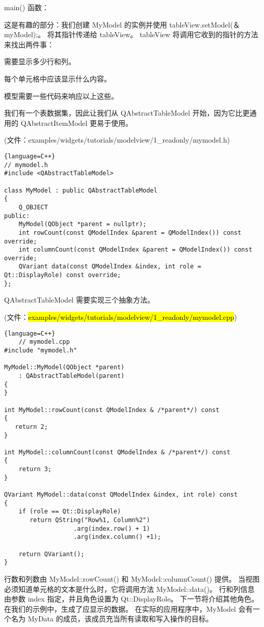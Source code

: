 main() 函数：

这是有趣的部分：我们创建 MyModel 的实例并使用 tableView.setModel(＆myModel);。 
将其指针传递给 tableView。 tableView 将调用它收到的指针的方法来找出两件事：

\begin{compactitem}
\item 需要显示多少行和列。
\item 每个单元格中应该显示什么内容。
\end{compactitem}

模型需要一些代码来响应以上这些。

我们有一个表数据集，因此让我们从 QAbstractTableModel 开始，因为它比更通用的 QAbstractItemModel 更易于使用。

(文件：examples/widgets/tutorials/modelview/1\_readonly/mymodel.h)

\begin{lstlisting}{language=C++}
// mymodel.h
#include <QAbstractTableModel>
	
class MyModel : public QAbstractTableModel
{
	Q_OBJECT
public:
	MyModel(QObject *parent = nullptr);
	int rowCount(const QModelIndex &parent = QModelIndex()) const override;
	int columnCount(const QModelIndex &parent = QModelIndex()) const override;
	QVariant data(const QModelIndex &index, int role = Qt::DisplayRole) const override;
};
\end{lstlisting}

QAbstractTableModel 需要实现三个抽象方法。

(文件：\hl{examples/widgets/tutorials/modelview/1\_readonly/mymodel.cpp})

\begin{lstlisting}{language=C++}
	// mymodel.cpp
#include "mymodel.h"

MyModel::MyModel(QObject *parent)
    : QAbstractTableModel(parent)
{
}

int MyModel::rowCount(const QModelIndex & /*parent*/) const
{
   return 2;
}

int MyModel::columnCount(const QModelIndex & /*parent*/) const
{
    return 3;
}

QVariant MyModel::data(const QModelIndex &index, int role) const
{
    if (role == Qt::DisplayRole)
       return QString("Row%1, Column%2")
                   .arg(index.row() + 1)
                   .arg(index.column() +1);

    return QVariant();
}
\end{lstlisting}


行数和列数由 MyModel::rowCount() 和 MyModel::columnCount() 提供。
当视图必须知道单元格的文本是什么时，它将调用方法 MyModel::data()。
行和列信息由参数 index 指定，并且角色设置为 Qt::DisplayRole。
下一节将介绍其他角色。在我们的示例中，生成了应显示的数据。
在实际的应用程序中，MyModel 会有一个名为 MyData 的成员，该成员充当所有读取和写入操作的目标。

